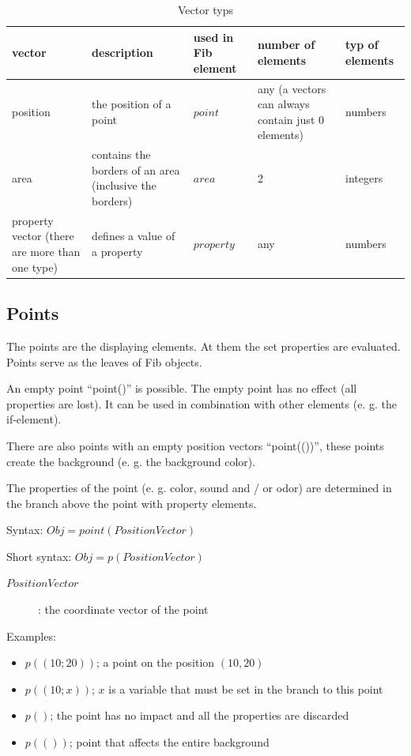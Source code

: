 \begin{table}[htbp]
\begin{center}
\begin{tabular}{|p{20mm}|p{35mm}|p{15mm}|p{20mm}|p{15mm}|}\hline
	vector & description & used in Fib element & number of elements & typ of elements \\\hline\hline
	position & the position of a point & $point$ & any (a vectors can always contain just 0 elements) & numbers \\\hline
	area & contains the borders of an area (inclusive the borders) & $area$ & 2 & integers \\\hline
	property vector (there are more than one type) & defines a value of a property & $property$ & any & numbers \\\hline
\end{tabular} 
\end{center}
\caption{Vector typs}
\label{tableVectorTyps}
\end{table}


\subsection{Points}
\label{fibPoint}\label{secFibPoint}

The points are the displaying elements. At them the set properties are evaluated. Points serve as the leaves of Fib objects.

An empty point ``point()'' is possible. The empty point has no effect (all properties are lost). It can be used in combination with other elements (e. g. the if-element).

There are also points with an empty position vectors ``point(())'', these points create the background (e. g. the background color).

The properties of the point (e. g. color, sound and / or odor) are determined in the branch above the point with property elements.

\bigskip\noindent
Syntax:
$Obj = point( PositionVector )$

\bigskip\noindent
Short syntax:
$Obj = p( PositionVector )$

\begin{description}
 \item[$PositionVector$]: the coordinate vector of the point
\end{description}

\bigskip\noindent
Examples:
\begin{itemize}
 \item $p((10;20))$; a point on the position $(10,20)$
 \item $p((10;x))$; $x$ is a variable that must be set in the branch to this point
 \item $p()$; the point has no impact and all the properties are discarded
 \item $p(())$; point that affects the entire background
\end{itemize}

